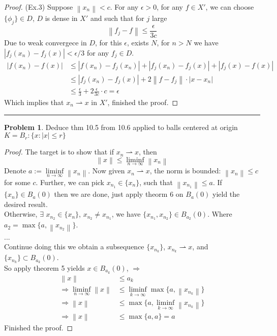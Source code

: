 \documentclass[a4paper, 10pt]{article}
\theoremstyle{definition}
\newtheorem{problem}{Problem}
\theoremstyle{hSol}
\begin{document}
~

\begin{proof} (Ex.3) Suppose $\left\|x_n\right\|<c$. For any $\epsilon>0$, for any $f\in X'$, we can choose $\{\phi_j\}\in D$, $D$ is dense in $X'$ and such that for $j$ large
$$
\left\|f_j - f\right\| \leq \frac{\epsilon}{3c}
$$
Due to weak convergece in $D$, for this $\epsilon$, exists $N$, for $n>N$ we have $|f_j(x_n)-f_j(x)|<\epsilon/3$ for any $f_j \in D$.
\begin{equation}
  \begin{split}
    |f(x_n)-f(x)| & \leq |f(x_n)-f_j(x_n)| + |f_j(x_n)-f_j(x)| + |f_j(x)-f(x)| \\
    & \leq |f_j(x_n)-f_j(x)| + 2\left\|f-f_j\right\|\cdot|x-x_n| \\
    & \leq \frac{\epsilon}{3} + 2 \frac{\epsilon}{3c} \cdot c = \epsilon
  \end{split}
\end{equation}
Which implies that $x_n \rightharpoonup x$ in $X'$, finished the proof.
\end{proof}

\noindent\rule{16cm}{0.4pt}
\begin{problem} Deduce thm 10.5 from 10.6 applied to balls centered at origin $K=B_r: \{x: |x|\leq r\}$
\end{problem}
\begin{proof} The target is to show that if $x_n \rightharpoonup x$, then 
$$
\left\|x\right\| \leq \liminf\limits_{n\rightarrow\infty} \left\|x_n\right\|
$$
Denote $a:=\liminf\limits_{n\rightarrow\infty}\left\|x_n\right\|$. Now given $x_n \rightharpoonup x$, the norm is bounded: $\left\|x_n\right\|\leq c$ for some $c$. Further, we can pick $x_{n_1}\in \{x_n\}$, such that $\left\|x_{n_1}\right\|\leq a$. If $\{x_n\}\in B_a(0)$ then we are done, just apply theorm 6 on $B_a(0)$ yield the desired result. \\
Otherwise, $\exists$ $x_{n_2}\in\{x_n\}$, $x_{n_2}\ne x_{n_1}$, we have $\{x_{n_1}, x_{n_2}\}\in B_{a_2}(0)$. Where $a_2=\max\{a, \left\|x_{n_2}\right\|\}$. \\
...\\
Continue doing this we obtain a subsequence $\{x_{n_k}\}$, $x_{n_k} \rightharpoonup x$, and $\{x_{n_k}\}\subset B_{a_k}(0)$. \\
So apply theorem 5 yields $x\in B_{a_k}(0)$, $\Rightarrow$
\begin{equation}
  \begin{split}
    \left\|x\right\| &\leq a_k \\
    \Rightarrow \liminf\limits_{n\rightarrow\infty} \left\|x\right\| &\leq \liminf\limits_{k\rightarrow\infty}\max\{a, \left\|x_{n_k}\right\|\} \\
    \Rightarrow \left\|x\right\| & \leq \max\{a, \liminf\limits_{k\rightarrow\infty}\left\|x_{n_k}\right\|\} \\
    \Rightarrow \left\| x \right\| &\leq \max\{a, a\} = a
  \end{split}
\end{equation}
Finished the proof.
\end{proof}
\end{document}
